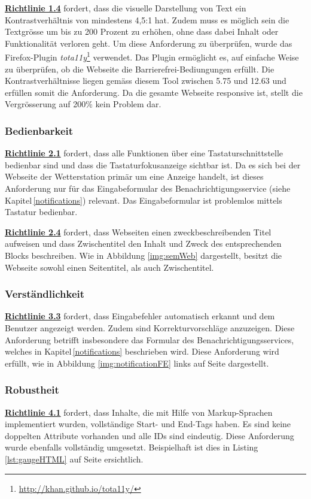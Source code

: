 \noindent
\href{https://www.w3.org/Translations/WCAG20-de/#visual-audio-contrast}{\textbf{Richtlinie 1.4}} fordert, dass die visuelle Darstellung von Text ein Kontrastverhältnis von mindestens 4,5:1 hat. Zudem muss es möglich sein die Textgrösse um bis zu 200 Prozent zu erhöhen, ohne dass dabei Inhalt oder Funktionalität verloren geht. Um diese Anforderung zu überprüfen, wurde das Firefox-Plugin \textit{tota11y}\footnote{\url{http://khan.github.io/tota11y/}} verwendet. Das Plugin ermöglicht es, auf einfache Weise zu überprüfen, ob die Webseite die Barrierefrei-Bediungungen erfüllt. Die Kontrastverhältnisse liegen gemäss diesem Tool zwischen 5.75 und 12.63 und erfüllen somit die Anforderung. Da die gesamte Webseite responsive ist, stellt die Vergrösserung auf 200\% kein Problem dar.


\subsubsection{Bedienbarkeit}
\href{https://www.w3.org/Translations/WCAG20-de/#keyboard-operation}{\textbf{Richtlinie 2.1}} fordert, dass alle Funktionen über eine Tastaturschnittstelle bedienbar sind und dass die Tastaturfokusanzeige sichtbar ist.
Da es sich bei der Webseite der Wetterstation primär um eine Anzeige handelt, ist dieses Anforderung nur für das Eingabeformular des Benachrichtigungsservice (siehe Kapitel\,\ref{notifications}) relevant. Das Eingabeformular ist problemlos mittels Tastatur bedienbar.\newline

\noindent
\href{https://www.w3.org/Translations/WCAG20-de/#navigation-mechanisms}{\textbf{Richtlinie 2.4}} fordert, dass Webseiten einen zweckbeschreibenden Titel aufweisen und dass Zwischentitel den Inhalt und Zweck des entsprechenden Blocks beschreiben. Wie in Abbildung \ref{img:semWeb} dargestellt, besitzt die Webseite sowohl einen Seitentitel, als auch Zwischentitel.

\newpage
\subsubsection{Verständlichkeit}
\href{https://www.w3.org/Translations/WCAG20-de/#minimize-error}{\textbf{Richtlinie 3.3}} fordert, dass Eingabefehler automatisch erkannt und dem Benutzer angezeigt werden. Zudem sind Korrekturvorschläge anzuzeigen. Diese Anforderung betrifft insbesondere das Formular des Benachrichtigungsservices, welches in Kapitel\,\ref{notifications} beschrieben wird. Diese Anforderung wird erfüllt, wie in Abbildung \ref{img:notificationFE} links auf Seite \pageref{img:notificationFE} dargestellt.


\subsubsection{Robustheit}
\href{https://www.w3.org/Translations/WCAG20-de/#ensure-compat}{\textbf{Richtlinie 4.1}} fordert, dass Inhalte, die mit Hilfe von Markup-Sprachen implementiert wurden,  vollständige Start- und End-Tags haben. Es sind keine doppelten Attribute vorhanden und alle IDs sind eindeutig. Diese Anforderung wurde ebenfalls vollständig umgesetzt. Beispielhaft ist dies in Listing \ref{lst:gaugeHTML} auf Seite \pageref{lst:gaugeHTML} ersichtlich.
